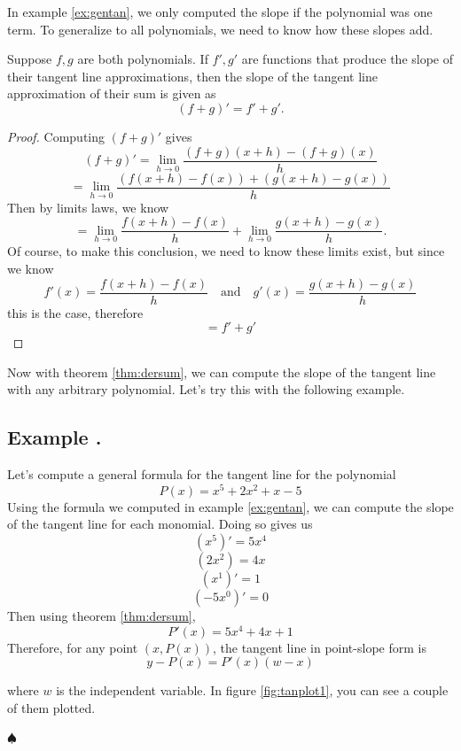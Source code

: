 \documentclass[11pt]{article}
\numberwithin{lemma}{section}
\numberwithin{equation}{section}
\numberwithin{define}{section}
\numberwithin{prop}{section}
\numberwithin{figure}{section}
\numberwithin{thm}{section}
\numberwithin{cor}{section}
\newcounter{ex}[section]
\newenvironment{ex}[0]{

	\refstepcounter{ex}
    \subsection*{Example \theex .}
    }
    {
    \hfill$\spadesuit$
    \par
    }
\numberwithin{ex}{section}
\def\jand{\quad\text{and}\quad}
\begin{document}
In example \eqref{ex:gentan}, we only computed the slope if the polynomial was one term. To generalize to all polynomials, we need to know how these slopes add. 

\begin{thm}
	Suppose $f,g$ are both polynomials. If $f',g'$ are functions that produce the slope of their tangent line approximations, then the slope of the tangent line approximation of their sum is given as
	$$(f+g)'=f'+g'.$$
	\label{thm:dersum}
\end{thm}
\begin{proof}
	Computing $(f+g)'$ gives
	$$(f+g)'=\lim_{h\to0}\frac{(f+g)(x+h)-(f+g)(x)}{h}$$
	$$=\lim_{h\to0}\frac{(f(x+h)-f(x))+(g(x+h)-g(x))}{h}$$
	Then by limits laws, we know
	$$=\lim_{h\to0}\frac{f(x+h)-f(x)}{h}+\lim_{h\to0}\frac{g(x+h)-g(x)}{h}.$$
	Of course, to make this conclusion, we need to know these limits exist, but since we know
	$$f'(x)=\frac{f(x+h)-f(x)}{h} \jand
		g'(x)=\frac{g(x+h)-g(x)}{h}$$
	this is the case, therefore
	$$=f'+g'$$
\end{proof}

Now with theorem \eqref{thm:dersum}, we can compute the slope of the tangent line with any arbitrary polynomial. Let's try this with the following example.

\begin{ex}
	Let's compute a general formula for the tangent line for the polynomial
	$$P(x)=x^5+2x^2+x-5$$
	Using the formula we computed in example \eqref{ex:gentan}, we can compute the slope of the tangent line for each monomial. Doing so gives us
	$$(x^5)'=5x^4$$
	$$(2x^2)=4x$$
	$$(x^1)'=1$$
	$$(-5x^0)'=0$$
	Then using theorem \eqref{thm:dersum},
	$$P'(x)=5x^4+4x+1$$
	Therefore, for any point $(x,P(x))$, the tangent line in point-slope form is
	$$y-P(x)=P'(x)(w-x)$$
	\begin{figure}[h]
		\centering
		\caption{}
		\label{fig:tanplot1}
	\end{figure}
	where $w$ is the independent variable. In figure \eqref{fig:tanplot1}, you can see a couple of them plotted.
\end{ex}
\end{document}
